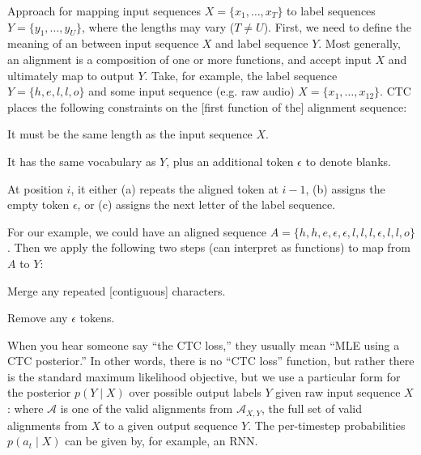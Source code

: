 \documentclass[11pt]{article}
\begin{document}
Approach for mapping input sequences $X = \{x_1, \ldots, x_T\}$ to label sequences $Y = \{y_1, \ldots, y_U \}$, where the lengths may vary ($T \ne U$). First, we need to define the meaning of an  between input sequence $X$ and label sequence $Y$. Most generally, an alignment is a composition of one or more functions, and accept input $X$ and ultimately map to output $Y$. Take, for example, the label sequence $Y = \{ h, e, l, l, o\}$ and some input sequence (e.g. raw audio) $X = \{x_1, \ldots, x_{12}\}$. CTC	 places the following constraints on the [first function of the] alignment sequence:
\begin{compactenum}
	\item It must be the same length as the input sequence $X$. 
	
	\item It has the same vocabulary as $Y$, plus an additional token $\epsilon$ to denote blanks. 
	
	\item At position $i$, it either (a) repeats the aligned token at $i-1$, (b) assigns the empty token $\epsilon$, or (c) assigns the next letter of the label sequence. 
\end{compactenum} 
For our example, we could have an aligned sequence $A = \{h, h, e, \epsilon, \epsilon, l, l, l, \epsilon, l, l, o\}$. Then we apply the following two steps (can interpret as functions) to map from $A$ to $Y$:
\begin{compactenum}
	\item Merge any repeated [contiguous] characters. 
	
	\item Remove any $\epsilon$ tokens. 
\end{compactenum}
When you hear someone say ``the CTC loss,'' they usually mean ``MLE using a CTC posterior.'' In other words, there is no ``CTC loss'' function, but rather there is the standard maximum likelihood objective, but we use a particular form for the posterior $p(Y \mid X)$ over possible output labels $Y$ given raw input sequence $X$:
where $\mathcal A$ is one of the valid alignments from $\mathcal{A}_{X, Y}$, the full set of valid alignments from $X$ to a given output sequence $Y$. The per-timestep probabilities $p(a_t \mid X)$ can be given by, for example, an RNN. 
\end{document}
